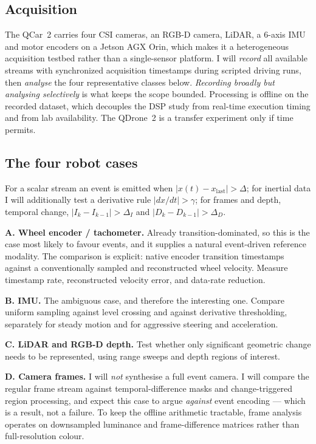 \documentclass[11pt,a4paper]{article}
\begin{document}
\subsection{Acquisition}

The QCar~2 carries four CSI cameras, an RGB-D camera, LiDAR, a 6-axis IMU and motor
encoders on a Jetson AGX Orin, which makes it a heterogeneous acquisition testbed rather
than a single-sensor platform. I will \emph{record} all available streams with synchronized acquisition
timestamps during scripted driving runs, then \emph{analyse} the four representative
classes below. \emph{Recording broadly but analysing selectively} is what keeps the scope
bounded. Processing is offline on the recorded dataset, which decouples the DSP study
from real-time execution timing and from lab availability. The QDrone~2 is a transfer
experiment only if time permits.

\subsection{The four robot cases}

For a scalar stream an event is emitted when $|x(t) - x_{\text{last}}| > \Delta$; for
inertial data I will additionally test a derivative rule $|dx/dt| > \gamma$; for frames
and depth, temporal change, $|I_k - I_{k-1}| > \Delta_I$ and $|D_k - D_{k-1}| > \Delta_D$.

\textbf{A. Wheel encoder / tachometer.} Already transition-dominated, so this is the
case most likely to favour events, and it supplies a natural event-driven reference
modality. The comparison is explicit: native encoder transition timestamps against a
conventionally sampled and reconstructed wheel velocity. Measure timestamp rate,
reconstructed velocity error, and data-rate reduction.

\textbf{B. IMU.} The ambiguous case, and therefore the interesting one. Compare uniform
sampling against level crossing and against derivative thresholding, separately for
steady motion and for aggressive steering and acceleration.

\textbf{C. LiDAR and RGB-D depth.} Test whether only significant geometric change needs
to be represented, using range sweeps and depth regions of interest.

\textbf{D. Camera frames.} I will \emph{not} synthesise a full event camera. I will
compare the regular frame stream against temporal-difference masks and
change-triggered region processing, and expect this case to argue \emph{against} event
encoding --- which is a result, not a failure. To keep the offline arithmetic tractable,
frame analysis operates on downsampled luminance and frame-difference matrices rather
than full-resolution colour.
\end{document}
